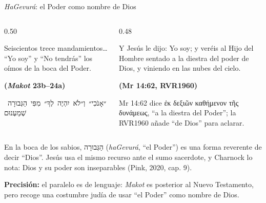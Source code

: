 \documentclass[hyperref={bookmarks=false},aspectratio=169]{beamer}
\newcommand{\heb}[1]{\mbox{\foreignlanguage{hebrew}{#1}}}
\newcommand{\grc}[1]{\foreignlanguage{ancientgreek}{#1}}
\newcommand{\fuente}[1]{\par\hfill{\upshape\bfseries\footnotesize\textcolor{azul}{#1}}}
\newcommand{\precision}[1]{{\footnotesize\color{gris}\textbf{Precisión:} #1}}
\begin{document}
\begin{frame}{\emph{HaGevurá}: el Poder como nombre de Dios}
\begin{columns}[c,onlytextwidth]
\begin{column}{0.50\textwidth}
\begin{cita}[colback=dorado!10!papiro,colframe=dorado!80!azul]Seiscientos trece mandamientos\ldots{} ``Yo soy'' y ``No tendrás'' los oímos de la boca del Poder.\fuente{(\emph{Makot} 23b--24a)}\end{cita}
\begin{center}\scriptsize\heb{״אָנֹכִי״ וְ״לֹא יִהְיֶה לְךָ״ מִפִּי הַגְּבוּרָה שְׁמַעְנוּם}\end{center}
\end{column}
\begin{column}{0.48\textwidth}
\begin{cita}Y Jesús le dijo: Yo soy; y veréis al Hijo del Hombre sentado a la diestra del poder de Dios, y viniendo en las nubes del cielo.\fuente{(Mr 14:62, RVR1960)}\end{cita}
\scriptsize Mr 14:62 dice \grc{ἐκ δεξιῶν καθήμενον τῆς δυνάμεως}, ``a la diestra del Poder''; la RVR1960 añade ``de Dios'' para aclarar.
\end{column}
\end{columns}\par\medskip
\small En la boca de los sabios, \heb{הַגְּבוּרָה} (\emph{haGevurá}, ``el Poder'') es una forma reverente de decir ``Dios''. Jesús usa el mismo recurso ante el sumo sacerdote, y Charnock lo nota: Dios y su poder son inseparables (Pink, 2020, cap. 9).\par\smallskip
\precision{el paralelo es de lenguaje: \emph{Makot} es posterior al Nuevo Testamento, pero recoge una costumbre judía de usar ``el Poder'' como nombre de Dios.}
\end{frame}
\end{document}
